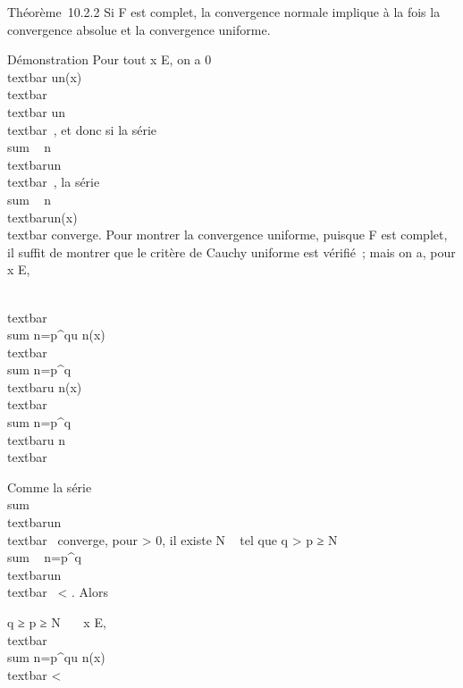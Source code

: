 Théorème~10.2.2 Si F est complet, la convergence normale implique à la
fois la convergence absolue et la convergence uniforme.

Démonstration Pour tout x \in E, on a 0 \leq\\textbar{}
un(x)\\textbar{} \leq\\textbar{}
un\\textbar{}\infty~, et donc si la série
\\sum ~
n\in{}~\\textbar{}un\\textbar{}\infty~,
la série \\sum ~
n\in{}~\\textbar{}un(x)\\textbar{}
converge. Pour montrer la convergence uniforme, puisque F est complet,
il suffit de montrer que le critère de Cauchy uniforme est vérifié~;
mais on a, pour x \in E,

\\textbar{}\\sum
n=p^qu n(x)\\textbar{}
\leq\\sum
n=p^q\\textbar{}u
n(x)\\textbar{} \leq\\sum
n=p^q\\textbar{}u
n\\textbar{}\infty~

Comme la série \\sum ~
\\textbar{}un\\textbar{}\infty~
converge, pour \epsilon \textgreater{} 0, il existe N \in {}~ tel que q
\textgreater{} p ≥ N
\rigtharrow~\\sum ~
n=p^q\\textbar{}un\\textbar{}\infty~
\textless{} \epsilon. Alors

q ≥ p ≥ N \rigtharrow~\forall~~x \in E,
\\textbar{}\\sum
n=p^qu n(x)\\textbar{}
\textless{} \epsilon

